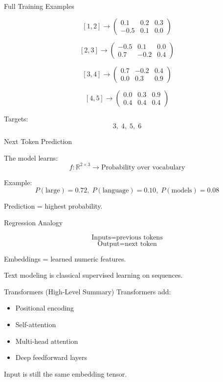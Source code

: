 \documentclass{beamer}
\begin{document}
\begin{frame}{Full Training Examples}

\[
[1,2] \rightarrow
\begin{pmatrix}
0.1 & 0.2 & 0.3 \\
-0.5 & 0.1 & 0.0
\end{pmatrix}
\]

\[
[2,3] \rightarrow
\begin{pmatrix}
-0.5 & 0.1 & 0.0 \\
0.7 & -0.2 & 0.4
\end{pmatrix}
\]

\[
[3,4] \rightarrow
\begin{pmatrix}
0.7 & -0.2 & 0.4 \\
0.0 & 0.3 & 0.9
\end{pmatrix}
\]

\[
[4,5] \rightarrow
\begin{pmatrix}
0.0 & 0.3 & 0.9 \\
0.4 & 0.4 & 0.4
\end{pmatrix}
\]

Targets:
\[
3,\;4,\;5,\;6
\]
\end{frame}

\begin{frame}{Next Token Prediction}

The model learns:
\[
f : \mathbb{R}^{2 \times 3} \rightarrow \text{Probability over vocabulary}
\]

Example:
\[
P(\text{large}) = 0.72,\;
P(\text{language}) = 0.10,\;
P(\text{models}) = 0.08
\]

Prediction = highest probability.
\end{frame}

\begin{frame}{Regression Analogy}

\[
\text{Inputs} = \text{previous tokens}
\]
\[
\text{Output} = \text{next token}
\]

Embeddings = learned numeric features.

Text modeling is classical supervised learning on sequences.
\end{frame}

\begin{frame}{Transformers (High-Level Summary)}
Transformers add:
\begin{itemize}
    \item Positional encoding
    \item Self-attention
    \item Multi-head attention
    \item Deep feedforward layers
\end{itemize}

Input is still the same embedding tensor.
\end{frame}
\end{document}
